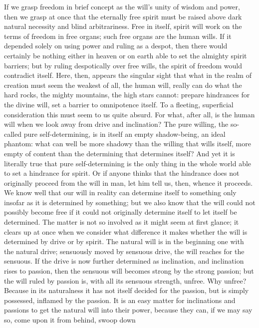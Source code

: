 \documentclass[12pt]{book}
\newcommand{\opage}[1]{\marginnote{\footnotesize\textit{[#1]}}}
\begin{document}
If we grasp freedom in brief concept as the will's unity of wisdom and
power, then we grasp at once that the eternally free spirit must be
raised above dark natural necessity and blind arbitrariness. Free in
itself, spirit will work on the terms of freedom in free organs; such
free organs are the human wills. If it depended solely on using power
and ruling as a despot, then there would certainly be nothing either in
heaven or on earth able to set the almighty spirit barriers; but by
ruling despotically over free wills, the spirit of freedom would
contradict itself. Here, then, appears the singular sight that what in
the realm of creation must seem the weakest of all, the human will,
really can do what the hard rocks, the mighty mountains, the high stars
cannot: prepare hindrances for the divine will, set a barrier to
omnipotence itself. To a fleeting, superficial consideration this must
seem to us quite absurd. For what, after all, is the human will when we
look away from drive and inclination? The pure willing, the so-called
pure
\opage{10}\setcounter{footnote}{0}%
self-determining, is in itself an empty shadow-being, an ideal phantom:
what can well be more shadowy than the willing that wills itself, more
empty of content than the determining that determines itself? And yet it
is literally true that pure self-determining is the only thing in the
whole world able to set a hindrance for spirit. Or if anyone thinks that
the hindrance does not originally proceed from the will in man, let him
tell us, then, whence it proceeds. We know well that our will in reality
can determine itself to something only insofar as it is determined by
something; but we also know that the will could not possibly become free
if it could not originally determine itself to let itself be determined.
The matter is not so involved as it might seem at first glance; it
clears up at once when we consider what difference it makes whether the
will is determined by drive or by spirit. The natural will is in the
beginning one with the natural drive; sensuously moved by sensuous
drive, the will reaches for the sensuous. If the drive is now further
determined as inclination, and inclination rises to passion, then the
sensuous will becomes strong by the strong passion; but the will ruled
by passion is, with all its sensuous strength, unfree. Why unfree?
Because in its naturalness it has not itself decided for the passion,
but is simply possessed, inflamed by the passion. It is an easy matter
for inclinations and passions to get the natural will into their power,
because they can, if we may say so, come upon it from behind, swoop down
\end{document}
